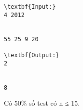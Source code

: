 \begin{verbatim}
\textbf{Input:}
4 2012


55 25 9 20

\textbf{Output:}
2


8\end{verbatim}
Có 50\% số test có n ≤ 15.